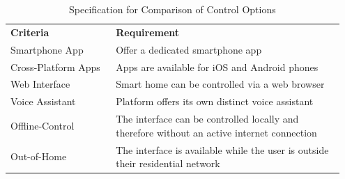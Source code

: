 \begin{table}[H]
    \centering
    \caption{Specification for Comparison of Control Options}
    \label{tab:spec_control}
    \begin{tabular}{ >{\raggedright} p{0.3\linewidth} p{0.65\linewidth} }
        \toprule
        \multicolumn{2}{ l }{\textbf{Control Options}} \\
        \midrule
        \textbf{Criteria} & \textbf{Requirement} \\
        \midrule
        Smartphone App & Offer a dedicated smartphone app \\ \addlinespace
        Cross-Platform Apps & Apps are available for iOS and Android phones \\ \addlinespace
        Web Interface & Smart home can be controlled via a web browser \\ \addlinespace
        Voice Assistant & Platform offers its own distinct voice assistant \\ \addlinespace
        Offline-Control & The interface can be controlled locally and therefore without an active internet connection \\ \addlinespace
        Out-of-Home & The interface is available while the user is outside their residential network \\ 
        \bottomrule
    \end{tabular}
\end{table}

